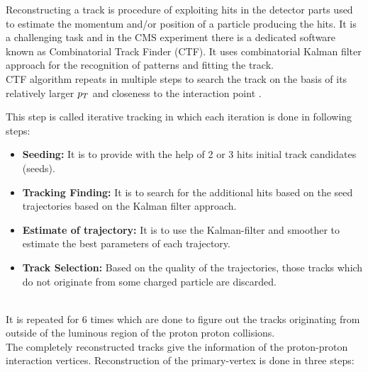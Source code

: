 Reconstructing a track is procedure of exploiting hits in the detector parts used to estimate the momentum and/or position of a particle producing the hits.
It is a challenging task and in the CMS experiment there is a dedicated software known as Combinatorial Track Finder (CTF).
It uses combinatorial Kalman filter approach for the recognition of patterns and fitting the track.\\
CTF algorithm repeats in  multiple steps to search the track on the basis of its relatively larger $p_T$ and closeness to the interaction point \cite{Chatrchyan:2014fea}.

This step is called iterative tracking in which each iteration is done in following steps:
\begin{itemize}
\item \textbf{Seeding:} It is to provide with the help of 2 or 3 hits initial track candidates (seeds).  
\item \textbf{Tracking Finding:} It is to search for the additional hits based on the seed trajectories based on the Kalman filter approach.  
\item \textbf{Estimate of trajectory: }  It is to use the Kalman-filter and smoother to estimate the best parameters of each trajectory.
\item \textbf{Track Selection: }  Based on the quality of the trajectories, those tracks which do not originate from some charged particle are discarded.
\end{itemize}\\

It is repeated for 6 times which are done to figure out the tracks originating from outside of the luminous region of the proton proton collisions. \\

The completely reconstructed tracks give the information of the proton-proton interaction vertices.
Reconstruction of the primary-vertex is done in three steps:

